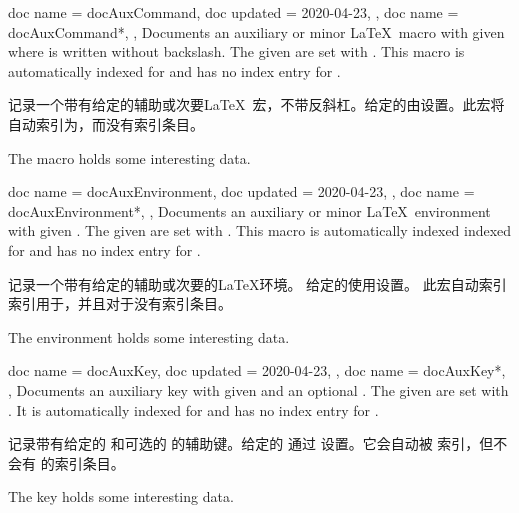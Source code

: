 \begin{docCommands}[doc parameter=\oarg{options}\marg{name}]
{
  {
    doc name    = docAuxCommand,
    doc updated = 2020-04-23,
  },
  {
    doc name = docAuxCommand*,
  },
}
Documents an auxiliary or minor \LaTeX\ macro with given 
where  is written without backslash.
The given  are set with .
This macro is automatically indexed for 
and has no index entry for .

记录一个带有给定的辅助或次要\LaTeX\ 宏，不带反斜杠。给定的由设置。此宏将自动索引为，而没有索引条目。
\begin{dispExample}
The macro  holds some interesting data.
\end{dispExample}
\end{docCommands}


\begin{docCommands}[doc parameter=\oarg{options}\marg{name}]
{
  {
    doc name    = docAuxEnvironment,
    doc updated = 2020-04-23,
  },
  {
    doc name = docAuxEnvironment*,
  },
}
Documents an auxiliary or minor \LaTeX\ environment with given .
The given  are set with .
This macro is automatically indexed indexed for 
and has no index entry for .

记录一个带有给定的辅助或次要的\LaTeX 环境。 给定的使用设置。 此宏自动索引索引用于，并且对于没有索引条目。
\begin{dispExample}
The environment  holds some interesting data.
\end{dispExample}
\end{docCommands}


\begin{docCommands}[doc parameter=\oarg{key path}\oarg{options}\marg{name}]
{
  {
    doc name    = docAuxKey,
    doc updated = 2020-04-23,
  },
  {
    doc name = docAuxKey*,
  },
}
Documents an auxiliary key with given  and an optional .
The given  are set with .
It is automatically indexed for 
and has no index entry for .

记录带有给定的  和可选的  的辅助键。给定的  通过  设置。它会自动被  索引，但不会有  的索引条目。
\begin{dispExample}
The key  holds some interesting data.
\end{dispExample}
\end{docCommands}
